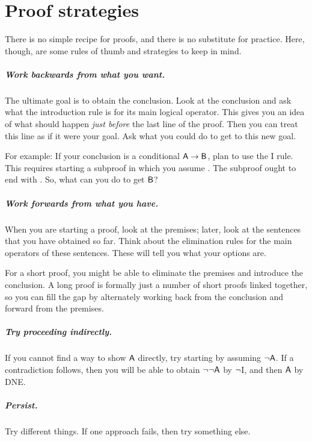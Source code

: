 \chapter{Proof strategies}
There is no simple recipe for proofs, and there is no substitute for practice. Here, though, are some rules of thumb and strategies to keep in mind.

\paragraph{Work backwards from what you want.}
The ultimate goal is to obtain the conclusion. Look at the conclusion and ask what the introduction rule is for its main logical operator. This gives you an idea of what should happen \emph{just before} the last line of the proof. Then you can treat this line as if it were your goal. Ask what you could do to get to this new goal.

For example: If your conclusion is a conditional $\mathsf{A}\rightarrow\mathsf{B}$, plan to use the {\eif}I rule. This requires starting a subproof in which you assume . The subproof ought to end with . So, what can you do to get $\mathsf{B}$?

\paragraph{Work forwards from what you have.}
When you are starting a proof, look at the premises; later, look at the sentences that you have obtained so far. Think about the elimination rules for the main operators of these sentences. These will tell you what your options are.

For a short proof, you might be able to eliminate the premises and introduce the conclusion. A long proof is formally just a number of short proofs linked together, so you can fill the gap by alternately working back from the conclusion and forward from the premises.

\paragraph{Try proceeding indirectly.}
If you cannot find a way to show $\mathsf{A}$ directly, try starting by assuming ${\neg} \mathsf{A}$. If a contradiction follows, then you will be able to obtain ${\neg} {\neg} \mathsf{A}$ by ${\neg}$I, and then $\mathsf{A}$ by DNE.  

\paragraph{Persist.}
Try different things. If one approach fails, then try something else.



